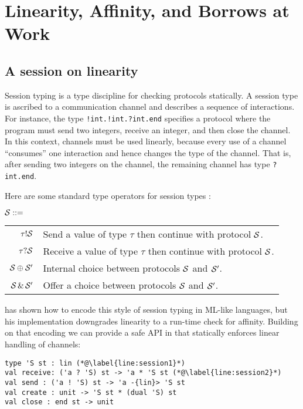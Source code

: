 \section{Linearity, Affinity, and Borrows at Work}


\subsection{A session on linearity}
\label{sec:session-linearity}

Session typing \cite{Honda1993,DBLP:conf/esop/HondaVK98} is a type
discipline for checking protocols statically. A session type is
ascribed to a communication channel and describes
a sequence of interactions. For instance, the type
\lstinline{!int.!int.?int.end} specifies a protocol
where the program must send two integers, receive an integer, and then
close the channel. 
%
In this context, channels must be used linearly, because every use of
a channel ``consumes'' one interaction and hence changes the type of the
channel. That is, after sending two integers on the channel,
the remaining channel has type \lstinline{?int.end}.

Here are some standard type operators for session types \SType:
\begin{center}
  $\mathcal S ::=$
  \begin{tabular}[t]{rl}
    $\tau ! \mathcal S$ & Send a value of type $\tau$ then continue with protocol $\mathcal S$.\\
    $\tau ? \mathcal S$& Receive a value of type $\tau$ then continue with protocol $\mathcal S$.\\
    $\mathcal S \oplus \mathcal S'$& Internal choice between protocols $\mathcal S$ and $\mathcal S'$.\\
    $\mathcal S \operatorname{\&} \mathcal S'$
                    & Offer a choice between protocols $\mathcal S$ and $\mathcal S'$. 
  \end{tabular}
\end{center}

\citet{DBLP:journals/jfp/Padovani17}  has shown how to encode this
style of session typing in ML-like languages, but his implementation
downgrades linearity to a run-time check for affinity. Building on that
encoding we can provide a safe API in \lang that statically enforces
linear handling of channels:
%
\begin{lstlisting}
type 'S st : lin (*@\label{line:session1}*)
val receive: ('a ? 'S) st -> 'a * 'S st (*@\label{line:session2}*)
val send : ('a ! 'S) st -> 'a -{lin}> 'S st
val create : unit -> 'S st * (dual 'S) st
val close : end st -> unit
\end{lstlisting}

